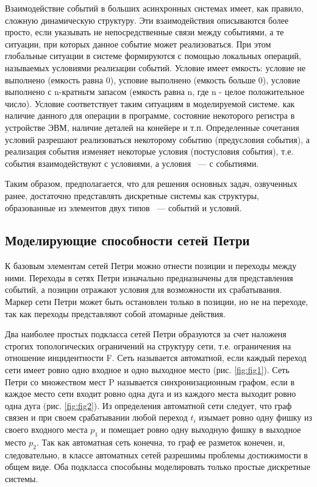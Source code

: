 Взаимодействие событий в больших асинхронных системах имеет, как правило, сложную динамическую структуру. Эти взаимодействия описываются более просто, если указывать не непосредственные связи между событиями, а те ситуации, при которых данное событие может реализоваться. При этом глобальные ситуации в системе формируются с помощью локальных операций, называемых условиями реализации событий. Условие имеет емкость: условие не выполнено (емкость равна 0), усповие выполнено (емкость больше 0), условие выполнено с n-кратньтм запасом
(емкость равна n, где n - целое положительное число). Условие соответствует таким ситуациям в моделируемой системе. как наличие данного для операции в программе, состояние некоторого регистра в устройстве ЭВМ, наличие деталей на конейере и т.п. Определенные сочетания условий разрешают реализоваться некоторому событию (предусловия события), а реализация события изменяет некоторые условия (постусловия события), т.е. события взаимодействуют с условиями, а условия ~--- с событиями.

Таким образом, предполагается, что для решения основных задач, озвученных ранее, достаточно представлять дискретные системы как структуры, образованные из элементов двух типов ~--- событий и условий.

\subsection{Моделирующие способности сетей Петри}

К базовым элементам сетей Петри можно отнести позиции и переходы между ними. Переходы в сетях Петри изначально предназначены для представления событий, а позиции отражают условия для возможности их срабатывания. Маркер сети Петри может быть остановлен только в позиции, но не на переходе, так как переходы представляют собой атомарные действия.

Два наиболее простых подкласса сетей Петри образуются за счет наложеня строгих топологических ограничений на структуру сети, т.е. ограничения на отношение инцидентности F. Сеть называется автоматной, если каждый переход сети имеет ровно одно входное и одно выходное место (рис. \ref{fig:fig1}). Сеть Петри со множеством мест P называется синхронизационным графом, если в каждое место сети входит ровно одна дуга и из каждого места выходит ровно одна дуга (рис. \ref{fig:fig2}). Из определения автоматной сети следует, что граф связен и при своем срабатывании любой переход $ t_{i} $ изымает ровно одну фишку из своего входного места $ p_{1} $ и помещает ровно одну выходную фишку в выходное место $ p_{2} $. Так как автоматная сеть конечна, то граф ее разметок конечен, и, следовательно, в классе автоматных сетей разрешимы проблемы достижимости в общем виде. Оба подкласса способыны моделировать только простые дискретные системы.

